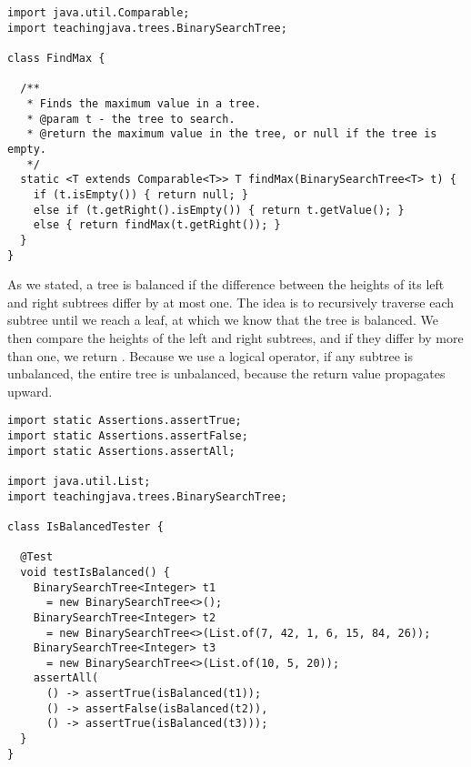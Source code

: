 \enlargethispage{3\baselineskip}
\begin{lstlisting}[language=MyJava]
import java.util.Comparable;
import teachingjava.trees.BinarySearchTree;

class FindMax {

  /**
   * Finds the maximum value in a tree.
   * @param t - the tree to search.
   * @return the maximum value in the tree, or null if the tree is empty.
   */
  static <T extends Comparable<T>> T findMax(BinarySearchTree<T> t) {
    if (t.isEmpty()) { return null; } 
    else if (t.getRight().isEmpty()) { return t.getValue(); } 
    else { return findMax(t.getRight()); }
  }
}
\end{lstlisting}

 As we stated, a tree is balanced if the difference between the heights of its left and right subtrees differ by at most one. The idea is to recursively traverse each subtree until we reach a leaf, at which we know that the tree is balanced. We then compare the heights of the left and right subtrees, and if they differ by more than one, we return . Because we use a logical  operator, if any subtree is unbalanced, the entire tree is unbalanced, because the  return value propagates upward.

\begin{lstlisting}[language=MyJava]
import static Assertions.assertTrue;
import static Assertions.assertFalse;
import static Assertions.assertAll;

import java.util.List;
import teachingjava.trees.BinarySearchTree;

class IsBalancedTester {

  @Test
  void testIsBalanced() {
    BinarySearchTree<Integer> t1 
      = new BinarySearchTree<>();
    BinarySearchTree<Integer> t2 
      = new BinarySearchTree<>(List.of(7, 42, 1, 6, 15, 84, 26));
    BinarySearchTree<Integer> t3 
      = new BinarySearchTree<>(List.of(10, 5, 20));
    assertAll(
      () -> assertTrue(isBalanced(t1));
      () -> assertFalse(isBalanced(t2)),
      () -> assertTrue(isBalanced(t3)));
  }
}
\end{lstlisting}

